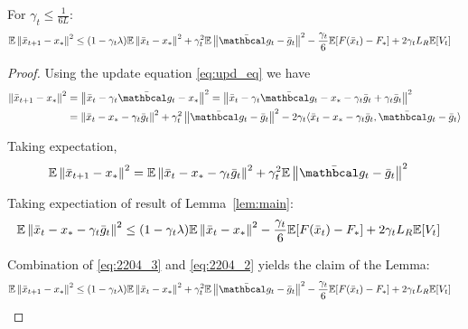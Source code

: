 \begin{lemma} \label{lem:very_main}
    For $\gamma_{t} \leq \frac{1}{6L}$:
    \begin{align}
        \E \norm{\bar{x}_{t+1}-x_*}^2
        &\leq (1 - \gamma_{t} \lambda) \E \norm{\bar{x}_t - x_*}^2 
        + \gamma_{t}^2 \E \norm{ \bar{\mc{g_t}} - \bar{g}_t}^2
        - \frac{\gamma_{t}}{6} \E [F(\bar{x}_t) - F_*] 
        + 2 \gamma_{t} L_R \E [V_t]
    \end{align}
\end{lemma}
\begin{proof}
    Using the update equation \eqref{eq:upd_eq} we have
    \begin{align}
        \norm{\bar{x}_{t+1}-x_*}^2
        &= \norm{\bar{x}_{t} - \gamma_{t} \bar {\mc{g_t}} - x_*}^2
        = \norm{\bar{x}_{t} - \gamma_{t} \bar {\mc{g_t}} - x_* - \gamma_{t} \bar{g}_t + \gamma_{t} \bar{g}_t}^2 \\
        &= \norm{\bar{x}_t - x_* - \gamma_{t} \bar{g}_t}^2 
        + \gamma_{t}^2 \norm{\bar {\mc{g_t}} - \bar{g}_t}^2
        - 2 \gamma_{t} \inner{\bar{x}_t - x_* - \gamma_{t} \bar{g}_t}{\bar {\mc{g_t}} - \bar{g}_t}
    \end{align}
    
    Taking expectation, 
    \begin{align}
        \E \norm{\bar{x}_{t+1}-x_*}^2
        &= \E \norm{\bar{x}_t - x_* - \gamma_{t} \bar{g}_t}^2
        + \gamma_{t}^2 \E \norm{ \bar {\mc{g_t}} - \bar{g}_t}^2 \label{eq:2204_3}
    \end{align}
    
    
    Taking expectiation of result of Lemma~\ref{lem:main}:
    \begin{align}
        \mathbb{E} \left\|\bar{x}_t - x_* - \gamma_{t} \bar{g}_t\right\|^2 
        &\leq (1 - \gamma_{t} \lambda) \mathbb{E} \left\|\bar{x}_t - x_*\right\|^2 
        - \frac{\gamma_{t}}{6} \mathbb{E} [F(\bar{x}_t) - F_*] 
        + 2 \gamma_{t} L_R \mathbb{E} [V_t] \label{eq:2204_2}
    \end{align}

    Combination of \eqref{eq:2204_3} and \eqref{eq:2204_2} yields the claim of the Lemma:
    \begin{align}
         \E \norm{\bar{x}_{t+1}-x_*}^2
        &\leq (1 - \gamma_{t} \lambda) \E \norm{\bar{x}_t - x_*}^2 
        + \gamma_{t}^2 \E \norm{ \bar{\mc{g_t}} - \bar{g}_t}^2
        - \frac{\gamma_{t}}{6} \E [F(\bar{x}_t) - F_*] 
        + 2 \gamma_{t} L_R \E [V_t]
    \end{align}
\end{proof}